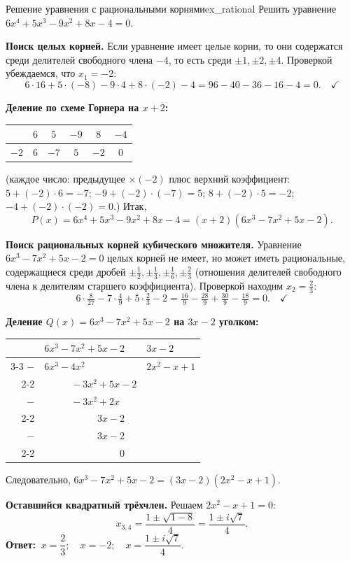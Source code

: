 \documentclass[12pt,a4paper]{article}
\begin{document}
\begin{definition}{Решение уравнения с рациональными корнями}{ex_rational}
Решить уравнение $6x^4 + 5x^3 - 9x^2 + 8x - 4 = 0$.

\medskip
\textbf{Поиск целых корней.} Если уравнение имеет целые корни, то
они содержатся среди делителей свободного члена $-4$, то есть среди
$\pm 1, \pm 2, \pm 4$. Проверкой убеждаемся, что $x_1 = -2$:
\[
6\cdot 16 + 5\cdot(-8) - 9\cdot 4 + 8\cdot(-2) - 4
= 96 - 40 - 36 - 16 - 4 = 0. \quad \checkmark
\]

\textbf{Деление по схеме Горнера на $x + 2$:}
\begin{center}
\renewcommand{\arraystretch}{1.3}
\begin{tabular}{c|ccccc}
  & $6$ & $5$ & $-9$ & $8$ & $-4$ \\
  \hline
  $-2$ & $6$ & $-7$ & $5$ & $-2$ & $0$ \\
\end{tabular}
\end{center}
(каждое число: предыдущее $\times(-2)$ плюс верхний коэффициент:
$5 + (-2)\cdot 6 = -7$; $-9 + (-2)\cdot(-7) = 5$;
$8 + (-2)\cdot 5 = -2$; $-4 + (-2)\cdot(-2) = 0$.) Итак,
\[
P(x) = 6x^4 + 5x^3 - 9x^2 + 8x - 4 = (x + 2)(6x^3 - 7x^2 + 5x - 2).
\]

\textbf{Поиск рациональных корней кубического множителя.}
Уравнение $6x^3 - 7x^2 + 5x - 2 = 0$ целых корней не имеет, но
может иметь рациональные, содержащиеся среди дробей
$\pm\frac{1}{2}, \pm\frac{1}{3}, \pm\frac{1}{6}, \pm\frac{2}{3}$
(отношения делителей свободного члена к делителям старшего
коэффициента). Проверкой находим $x_2 = \frac{2}{3}$:
\[
6\cdot\tfrac{8}{27} - 7\cdot\tfrac{4}{9} + 5\cdot\tfrac{2}{3} - 2
= \tfrac{16}{9} - \tfrac{28}{9} + \tfrac{30}{9} - \tfrac{18}{9}
= 0. \quad \checkmark
\]

\textbf{Деление $Q(x) = 6x^3 - 7x^2 + 5x - 2$ на $3x - 2$ уголком:}
\begin{center}
\renewcommand{\arraystretch}{1.3}
\begin{tabular}{r@{\;}l|l}
  & $6x^3 - 7x^2 + 5x - 2$ & \;$3x - 2$ \\
  \cline{3-3}
  $-$ & $6x^3 - 4x^2$ & \;$2x^2 - x + 1$ \\
  \cline{2-2}
  & $\phantom{6x^3+}-3x^2 + 5x - 2$ & \\
  $-$ & $\phantom{6x^3+}-3x^2 + 2x$ & \\
  \cline{2-2}
  & $\phantom{6x^3-3x^2+}3x - 2$ & \\
  $-$ & $\phantom{6x^3-3x^2+}3x - 2$ & \\
  \cline{2-2}
  & $\phantom{6x^3-3x^2+3x-}0$ & \\
\end{tabular}
\end{center}
Следовательно, $6x^3 - 7x^2 + 5x - 2 = (3x - 2)(2x^2 - x + 1)$.

\textbf{Оставшийся квадратный трёхчлен.} Решаем
$2x^2 - x + 1 = 0$:
\[
x_{3,4} = \frac{1 \pm \sqrt{1 - 8}}{4} = \frac{1 \pm i\sqrt{7}}{4}.
\]
\textbf{Ответ:} $\ x = \dfrac{2}{3};\quad x = -2;\quad
x = \dfrac{1 \pm i\sqrt{7}}{4}.$
\end{definition}
\end{document}
